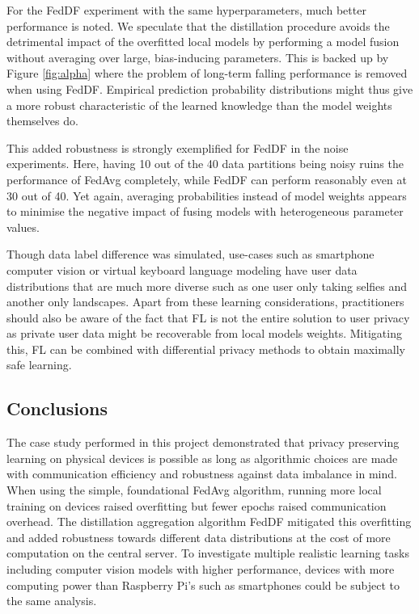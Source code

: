 \documentclass{article}
\begin{document}
For the FedDF experiment with the same hyperparameters, much better performance is noted.
We speculate that the distillation procedure avoids the detrimental impact of the overfitted local models by performing a model fusion without averaging over large, bias-inducing parameters.
This is backed up by Figure \ref{fig:alpha} where the problem of long-term falling performance is removed when using FedDF.
Empirical prediction probability distributions might thus give a more robust characteristic of the learned knowledge than the model weights themselves do.

This added robustness is strongly exemplified for FedDF in the noise experiments.
Here, having 10 out of the 40 data partitions being noisy ruins the performance of FedAvg completely, while FedDF can perform reasonably even at 30 out of 40.
Yet again, averaging probabilities instead of model weights appears to minimise the negative impact of fusing models with heterogeneous parameter values.

Though data label difference was simulated, use-cases such as smartphone computer vision or virtual keyboard language modeling have user data distributions that are much more diverse such as one user only taking selfies and another only landscapes.
Apart from these learning considerations, practitioners should also be aware of the fact that FL is not the entire solution to user privacy as private user data might be recoverable from local models weights.
Mitigating this, FL can be combined with differential privacy methods \cite{xiong2020ldp} to obtain maximally safe learning.

\subsection{Conclusions}
The case study performed in this project demonstrated that privacy preserving learning on physical devices is possible as long as algorithmic choices are made with communication efficiency and robustness against data imbalance in mind.
When using the simple, foundational FedAvg algorithm, running more local training on devices raised overfitting but fewer epochs raised communication overhead.
The distillation aggregation algorithm FedDF mitigated this overfitting and added robustness towards different data distributions at the cost of more computation on the central server.
To investigate multiple realistic learning tasks including computer vision models with higher performance, devices with more computing power than Raspberry Pi's such as smartphones could be subject to the same analysis.
\end{document}
